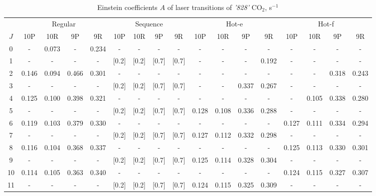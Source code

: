 \documentclass{report}
\begin{document}
\begin{appendices}
\begin{sidewaystable}
\centering
\caption{Einstein coefficients $A$ of laser transitions of \textit{'828'} {CO$_2$}, s$^{-1}$}
\label{table:A828}
\scriptsize
\begin{tabular}{|c|cccc|cccc|cccc|cccc|}
\hline
& \multicolumn{4}{c|}{Regular}& \multicolumn{4}{c|}{Sequence}& \multicolumn{4}{c|}{Hot-e}& \multicolumn{4}{c|}{Hot-f}\\
$J$ & 10P & 10R & 9P & 9R & 10P & 10R & 9P & 9R & 10P & 10R & 9P & 9R & 10P & 10R & 9P & 9R\\ 
\hline
0  &   -   & 0.073 &   -   & 0.234 &   -   &   -   &   -   &   -   &   -   &   -   &   -   &   -   &   -   &   -   &   -   &   -  \\
1  &   -   &   -   &   -   &   -   & [0.2] & [0.2] & [0.7] & [0.7] &   -   &   -   &   -   & 0.192 &   -   &   -   &   -   &   -  \\
2  & 0.146 & 0.094 & 0.466 & 0.301 &   -   &   -   &   -   &   -   &   -   &   -   &   -   &   -   &   -   &   -   & 0.318 & 0.243\\
3  &   -   &   -   &   -   &   -   & [0.2] & [0.2] & [0.7] & [0.7] &   -   &   -   & 0.337 & 0.267 &   -   &   -   &   -   &   -  \\
4  & 0.125 & 0.100 & 0.398 & 0.321 &   -   &   -   &   -   &   -   &   -   &   -   &   -   &   -   &   -   & 0.105 & 0.338 & 0.280\\
5  &   -   &   -   &   -   &   -   & [0.2] & [0.2] & [0.7] & [0.7] & 0.128 & 0.108 & 0.336 & 0.288 &   -   &   -   &   -   &   -  \\
6  & 0.119 & 0.103 & 0.379 & 0.330 &   -   &   -   &   -   &   -   &   -   &   -   &   -   &   -   & 0.127 & 0.111 & 0.334 & 0.294\\
7  &   -   &   -   &   -   &   -   & [0.2] & [0.2] & [0.7] & [0.7] & 0.127 & 0.112 & 0.332 & 0.298 &   -   &   -   &   -   &   -  \\
8  & 0.116 & 0.104 & 0.368 & 0.337 &   -   &   -   &   -   &   -   &   -   &   -   &   -   &   -   & 0.125 & 0.113 & 0.330 & 0.301\\
9  &   -   &   -   &   -   &   -   & [0.2] & [0.2] & [0.7] & [0.7] & 0.125 & 0.114 & 0.328 & 0.304 &   -   &   -   &   -   &   -  \\
10 & 0.114 & 0.105 & 0.363 & 0.340 &   -   &   -   &   -   &   -   &   -   &   -   &   -   &   -   & 0.124 & 0.115 & 0.327 & 0.307\\
11 &   -   &   -   &   -   &   -   & [0.2] & [0.2] & [0.7] & [0.7] & 0.124 & 0.115 & 0.325 & 0.309 &   -   &   -   &   -   &   -  \\

\end{tabular}
\end{sidewaystable}
\end{appendices}
\end{document}
